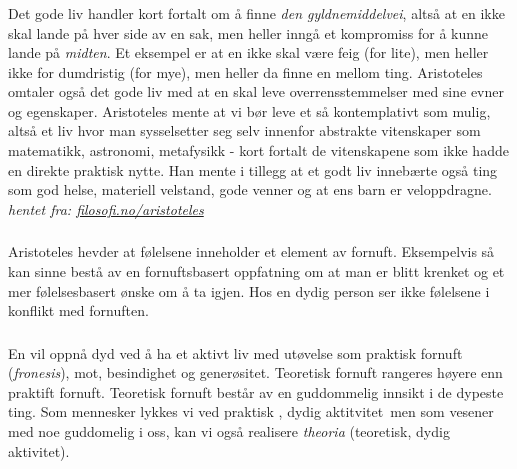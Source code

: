 \documentclass[a4paper]{IEEEtran}
\begin{document}
        \subsubsection{}
        Det gode liv handler kort fortalt om å finne \textit{den gyldnemiddelvei}, 
        altså at en ikke skal lande på hver side av en sak, men heller inngå et 
        kompromiss for å kunne lande på \textit{midten}. Et eksempel er 
        at en ikke skal være feig (for lite), men heller ikke for dumdristig (for mye),
        men heller da finne en mellom ting. Aristoteles omtaler også det gode liv med 
        at en skal leve overrensstemmelser med sine evner og egenskaper.
        Aristoteles mente at vi bør leve et så kontemplativt som mulig, altså et 
        liv hvor man sysselsetter seg selv innenfor abstrakte vitenskaper som 
        matematikk, astronomi, metafysikk - kort fortalt de vitenskapene som 
        ikke hadde en direkte praktisk nytte. Han mente i tillegg at et godt liv
        innebærte også ting som god helse, materiell velstand, gode venner 
        og at ens barn er veloppdragne. 
        \textit{hentet fra: \url{filosofi.no/aristoteles}} \medskip

        \subsubsection{}
        Aristoteles hevder at følelsene inneholder et element av fornuft. 
        Eksempelvis så kan sinne bestå av en fornuftsbasert oppfatning om at
        man er blitt krenket og et mer følelsesbasert ønske om å ta igjen.
        Hos en dydig person ser ikke følelsene i konflikt med fornuften.
        \cite{rephefte_aristoteles} \medskip

        \subsubsection{}
        En vil oppnå dyd ved å ha et aktivt liv med utøvelse som praktisk fornuft
        (\textit{fronesis}), mot, besindighet og generøsitet. Teoretisk fornuft
        rangeres høyere enn praktift fornuft. Teoretisk fornuft består 
        av en guddommelig innsikt i de dypeste ting. Som mennesker 
        lykkes vi ved praktisk , dydig aktitvitet men som vesener med 
        noe guddomelig i oss, kan vi også realisere \textit{theoria}
        (teoretisk, dydig aktivitet).\cite{snl_aristoteles} \medskip
\end{document}
